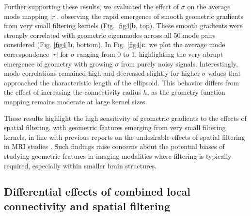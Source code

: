 \documentclass{article}
\begin{document}
 Further supporting these results, we evaluated the effect of $\sigma$ on the average mode mapping $|r|$, observing the rapid emergence of smooth geometric gradients from very small filtering kernels (Fig. \ref{fig4}\textbf{b}, top). These smooth gradients were strongly correlated with geometric eigenmodes across all 50 mode pairs considered (Fig. \ref{fig4}\textbf{b}, bottom). In Fig. \ref{fig4}\textbf{c}, we plot the average mode correspondence $|r|$ for $\sigma$ ranging from $0$ to $1$, highlighting the very abrupt emergence of geometry with growing $\sigma$ from purely noisy signals. Interestingly, mode correlations remained high and decreased slightly for higher $\sigma$ values that approached the characteristic length of the ellipsoid. This behavior differs from the effect of increasing the connectivity radius $h$, as the geometry-function mapping remains moderate at large kernel sizes. 
 
 These results highlight the high sensitivity of geometric gradients to the effects of spatial filtering, with geometric features emerging from very small filtering kernels, in line with previous reports on the undesirable effects of spatial filtering in MRI studies \cite{watson2023connectopic}. Such findings raise concerns about the potential biases of studying geometric features in imaging modalities where filtering is typically required, especially within smaller brain structures.

\subsection*{Differential effects of combined local connectivity and spatial filtering}


\end{document}
